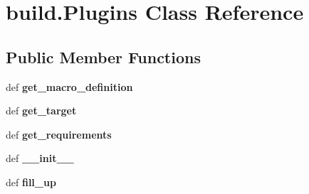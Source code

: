 \hypertarget{classbuild_1_1Plugins}{\section{build.\-Plugins \-Class \-Reference}
\label{classbuild_1_1Plugins}
}
\subsection*{\-Public \-Member \-Functions}
\begin{DoxyCompactItemize}
\item 
\hypertarget{classbuild_1_1Plugins_aa571e0de54dc2c0c3c0cac9ad630cb17}{def {\bfseries get\-\_\-macro\-\_\-definition}}\label{classbuild_1_1Plugins_aa571e0de54dc2c0c3c0cac9ad630cb17}

\item 
\hypertarget{classbuild_1_1Plugins_a883123d13c115c0d3fd06e12ff6166f9}{def {\bfseries get\-\_\-target}}\label{classbuild_1_1Plugins_a883123d13c115c0d3fd06e12ff6166f9}

\item 
\hypertarget{classbuild_1_1Plugins_a73aa6fdad0b236fd7e33def0531dfe40}{def {\bfseries get\-\_\-requirements}}\label{classbuild_1_1Plugins_a73aa6fdad0b236fd7e33def0531dfe40}

\item 
\hypertarget{classbuild_1_1Plugins_a2f59553e1bc80913116d02397dbe75aa}{def {\bfseries \-\_\-\-\_\-init\-\_\-\-\_\-}}\label{classbuild_1_1Plugins_a2f59553e1bc80913116d02397dbe75aa}

\item 
\hypertarget{classbuild_1_1Plugins_acfc0c318a345ee641b29f07c60cc6ad1}{def {\bfseries fill\-\_\-up}}\label{classbuild_1_1Plugins_acfc0c318a345ee641b29f07c60cc6ad1}

\end{DoxyCompactItemize}
